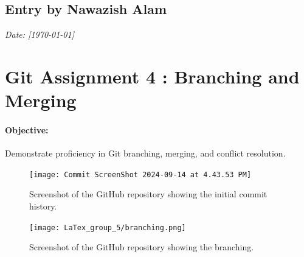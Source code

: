 \documentclass[a4paper,12pt]{article}
\begin{document}
\newpage
{}
\vspace{-2cm}
\subsection*{Entry by Nawazish Alam}
\textit{Date: [\today]}\\
\section*{\Huge{Git Assignment 4 : Branching and Merging}}

\paragraph{Objective:} Demonstrate proficiency in Git branching, merging, and conflict resolution.

\vspace{0.5cm}

\begin{figure}[h!]
    \centering
    \texttt{[image: Commit ScreenShot 2024-09-14 at 4.43.53 PM]} %
     \hspace{4 cm}
    \caption{Screenshot of the GitHub repository showing the initial commit history.}
\end{figure}

\begin{figure}[h!]
    \centering
    \texttt{[image: LaTex\_group\_5/branching.png]} %
     \hspace{4 cm}
    \caption{Screenshot of the GitHub repository showing the branching.}
\end{figure}
\newpage
{}
\vspace{-1.5cm}
\end{document}
